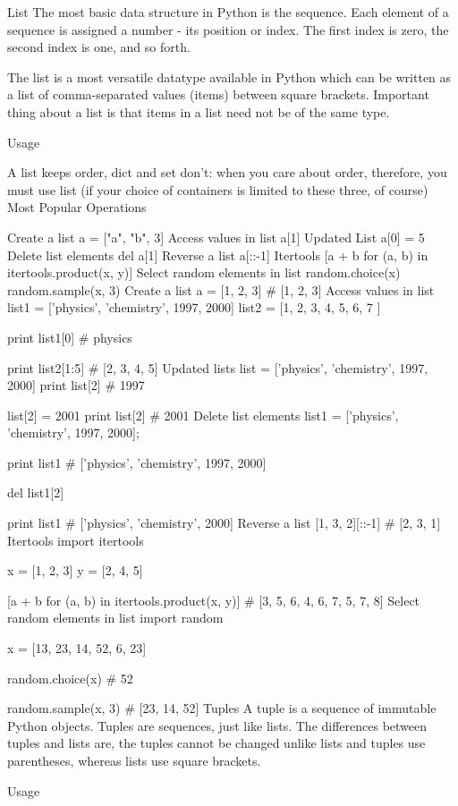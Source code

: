 List
The most basic data structure in Python is the sequence. Each element of a sequence is assigned a number - its position or index. The first index is zero, the second index is one, and so forth.

The list is a most versatile datatype available in Python which can be written as a list of comma-separated values (items) between square brackets. Important thing about a list is that items in a list need not be of the same type.

Usage

A list keeps order, dict and set don't: when you care about order, therefore, you must use list (if your choice of containers is limited to these three, of course)
Most Popular Operations

Create a list
a = ["a", "b", 3]
Access values in list
a[1]
Updated List
a[0] = 5
Delete list elements
del a[1]
Reverse a list
a[::-1]
Itertools
[a + b for (a, b) in itertools.product(x, y)]
Select random elements in list
random.choice(x)
random.sample(x, 3)
Create a list
a = [1, 2, 3]
# [1, 2, 3]
Access values in list
list1 = ['physics', 'chemistry', 1997, 2000]
list2 = [1, 2, 3, 4, 5, 6, 7 ]

print list1[0]   # physics

print list2[1:5] # [2, 3, 4, 5]
Updated lists
list = ['physics', 'chemistry', 1997, 2000]
print list[2] # 1997

list[2] = 2001
print list[2] # 2001
Delete list elements
list1 = ['physics', 'chemistry', 1997, 2000];

print list1
# ['physics', 'chemistry', 1997, 2000]

del list1[2]

print list1
# ['physics', 'chemistry', 2000]
Reverse a list
[1, 3, 2][::-1]
# [2, 3, 1]
Itertools
import itertools

x = [1, 2, 3]
y = [2, 4, 5]

[a + b for (a, b) in itertools.product(x, y)]
# [3, 5, 6, 4, 6, 7, 5, 7, 8]
Select random elements in list
import random

x = [13, 23, 14, 52, 6, 23]

random.choice(x) # 52

random.sample(x, 3) # [23, 14, 52]
Tuples
A tuple is a sequence of immutable Python objects. Tuples are sequences, just like lists. The differences between tuples and lists are, the tuples cannot be changed unlike lists and tuples use parentheses, whereas lists use square brackets.

Usage

